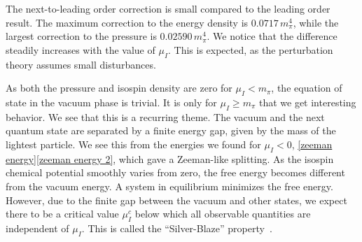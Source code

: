 
The next-to-leading order correction is small compared to the leading order result.
The maximum correction to the energy density is $0.0717 \, m_\pi^4$, while the largest correction to the pressure is $0.02590\, m_\pi^4$.
We notice that the difference steadily increases with the value of $\mu_I$.
This is expected, as the perturbation theory assumes small disturbances.

As both the pressure and isospin density are zero for $\mu_I < m_\pi$, the equation of state in the vacuum phase is trivial.
It is only for $\mu_I \geq m_\pi$ that we get interesting behavior.
We see that this is a recurring theme.
The vacuum and the next quantum state are separated by a finite energy gap, given by the mass of the lightest particle.
We see this from the energies we found for $\mu_I < 0$, \autoref{zeeman energy}\autoref{zeeman energy 2}, which gave a Zeeman-like splitting.
As the isospin chemical potential smoothly varies from zero, the free energy becomes different from the vacuum energy.
A system in equilibrium minimizes the free energy. 
However, due to the finite gap between the vacuum and other states, we expect there to be a critical value $\mu_I^c$ below which all observable quantities are independent of $\mu_I$.
This is called the ``Silver-Blaze'' property~\autocite{cohenQCDInequalitiesNucleon2003,gunkelMesonsFiniteChemical2020}.

